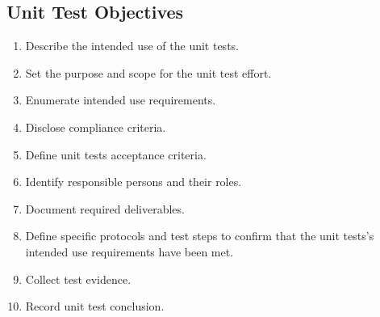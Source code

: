 \subsection{Unit Test Objectives}
\begin{enumerate}
  \item Describe the intended use of the unit tests.
  \item Set the purpose and scope for the unit test effort.
  \item Enumerate intended use requirements.
  \item Disclose compliance criteria.
  \item Define unit tests acceptance criteria.
  \item Identify responsible persons and their roles.
  \item Document required deliverables.
  \item Define specific protocols and test steps to confirm that the unit
    tests's intended use requirements have been met.
  \item Collect test evidence.
  \item Record unit test conclusion.
\end{enumerate}
